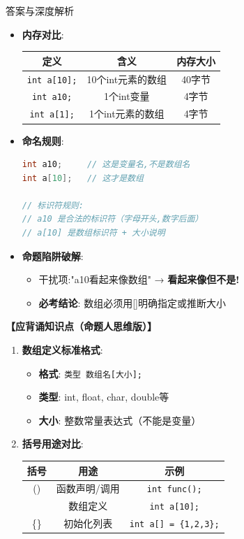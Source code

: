 \documentclass[a4paper,12pt]{article}
\begin{document}
\begin{bluebox}{答案与深度解析}
\begin{itemize}[leftmargin=*, nosep]
		\item \textbf{内存对比}:
		      \begin{tabular}{|c|c|c|}
			      \hline
			      \textbf{定义}         & \textbf{含义} & \textbf{内存大小} \\
			      \hline
			      \texttt{int a[10];} & 10个int元素的数组 & 40字节          \\
			      \hline
			      \texttt{int a10;}   & 1个int变量     & 4字节           \\
			      \hline
			      \texttt{int a[1];}  & 1个int元素的数组  & 4字节           \\
			      \hline
		      \end{tabular}

		\item \textbf{命名规则}:
		      \begin{lstlisting}[language=C]
int a10;     // 这是变量名,不是数组名
int a[10];   // 这才是数组

// 标识符规则:
// a10 是合法的标识符（字母开头,数字后面）
// a[10] 是数组标识符 + 大小说明
    \end{lstlisting}

		\item \textbf{命题陷阱破解}:
		      \begin{itemize}
			      \item 干扰项:"a10看起来像数组" → \textbf{看起来像但不是!}
			      \item \textbf{必考结论}: 数组必须用[]明确指定或推断大小
		      \end{itemize}
	\end{itemize}

	\textbf{【应背诵知识点（命题人思维版）】}
	\begin{enumerate}[leftmargin=*, nosep]
		\item \textbf{数组定义标准格式}:
		      \begin{itemize}
			      \item \textbf{格式}: \texttt{类型 数组名[大小];}
			      \item \textbf{类型}: int, float, char, double等
			      \item \textbf{大小}: 整数常量表达式（不能是变量）
		      \end{itemize}

		\item \textbf{括号用途对比}:
		      \begin{tabular}{|c|c|c|}
			      \hline
			      \textbf{括号} & \textbf{用途} & \textbf{示例}                   \\
			      \hline
			      ()          & 函数声明/调用     & \texttt{int func();}          \\
			      \hline
			      []          & 数组定义        & \texttt{int a[10];}           \\
			      \hline
			      \{\}        & 初始化列表       & \texttt{int a[] = \{1,2,3\};} \\
			      \hline
		      \end{tabular}


\end{enumerate}
\end{bluebox}
\end{document}
